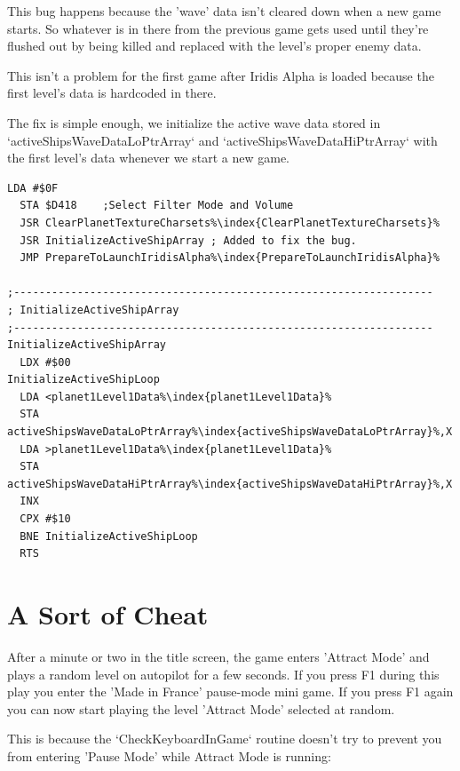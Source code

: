 This bug happens because the 'wave' data isn't cleared down when a new game
starts. So whatever is in there from the previous game gets used until they're
flushed out by being killed and replaced with the level's proper enemy data.

This isn't a problem for the first game after Iridis Alpha is loaded because
the first level's data is hardcoded in there.

The fix is simple enough, we initialize the active wave data stored in `activeShipsWaveDataLoPtrArray` and `activeShipsWaveDataHiPtrArray`
with the first level's data whenever we start a new game. 

\begin{lstlisting}[caption=Fixing the reappearing enemy bug,escapechar=\%]
  LDA #$0F 
  STA $D418    ;Select Filter Mode and Volume 
  JSR ClearPlanetTextureCharsets%\index{ClearPlanetTextureCharsets}% 
  JSR InitializeActiveShipArray ; Added to fix the bug.
  JMP PrepareToLaunchIridisAlpha%\index{PrepareToLaunchIridisAlpha}% 

;------------------------------------------------------------------ 
; InitializeActiveShipArray 
;------------------------------------------------------------------ 
InitializeActiveShipArray 
  LDX #$00 
InitializeActiveShipLoop 
  LDA <planet1Level1Data%\index{planet1Level1Data}% 
  STA activeShipsWaveDataLoPtrArray%\index{activeShipsWaveDataLoPtrArray}%,X 
  LDA >planet1Level1Data%\index{planet1Level1Data}% 
  STA activeShipsWaveDataHiPtrArray%\index{activeShipsWaveDataHiPtrArray}%,X 
  INX 
  CPX #$10 
  BNE InitializeActiveShipLoop 
  RTS 
\end{lstlisting}

\section{A Sort of Cheat}

After a minute or two in the title screen, the game enters 'Attract Mode' and
plays a random level on autopilot for a few seconds. If you press F1 during
this play you enter the 'Made in France' pause-mode mini game. If you press F1
again you can now start playing the level 'Attract Mode' selected at random.

This is because the `CheckKeyboardInGame` routine doesn't try to prevent you
from entering 'Pause Mode' while Attract Mode is running:


